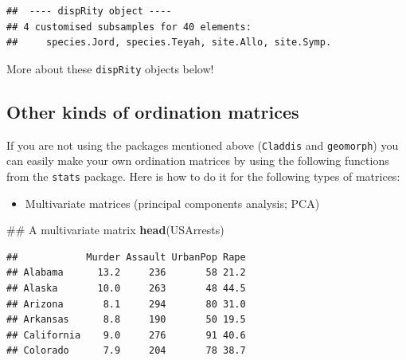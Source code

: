 \documentclass[]{book}
\newenvironment{Shaded}{\begin{snugshade}}{\end{snugshade}}
\newcommand{\KeywordTok}[1]{\textcolor[rgb]{0.13,0.29,0.53}{\textbf{#1}}}
\newcommand{\StringTok}[1]{\textcolor[rgb]{0.31,0.60,0.02}{#1}}
\newcommand{\OperatorTok}[1]{\textcolor[rgb]{0.81,0.36,0.00}{\textbf{#1}}}
\newcommand{\NormalTok}[1]{#1}
\providecommand{\tightlist}{%
  \setlength{\itemsep}{0pt}\setlength{\parskip}{0pt}}
\theoremstyle{definition}
\theoremstyle{definition}
\theoremstyle{remark}
\begin{document}
\begin{verbatim}
##  ---- dispRity object ---- 
## 4 customised subsamples for 40 elements:
##     species.Jord, species.Teyah, site.Allo, site.Symp.
\end{verbatim}

More about these \texttt{dispRity} objects below!

\subsection{Other kinds of ordination
matrices}\label{other-kinds-of-ordination-matrices}

If you are not using the packages mentioned above (\texttt{Claddis} and
\texttt{geomorph}) you can easily make your own ordination matrices by
using the following functions from the \texttt{stats} package. Here is
how to do it for the following types of matrices:

\begin{itemize}
\tightlist
\item
  Multivariate matrices (principal components analysis; PCA)
\end{itemize}

\begin{Shaded}
\begin{Highlighting}[]
\NormalTok{## A multivariate matrix}
\KeywordTok{head}\NormalTok{(USArrests)}
\end{Highlighting}
\end{Shaded}

\begin{verbatim}
##            Murder Assault UrbanPop Rape
## Alabama      13.2     236       58 21.2
## Alaska       10.0     263       48 44.5
## Arizona       8.1     294       80 31.0
## Arkansas      8.8     190       50 19.5
## California    9.0     276       91 40.6
## Colorado      7.9     204       78 38.7
\end{verbatim}

\begin{Shaded}
\end{Shaded}
\end{document}

